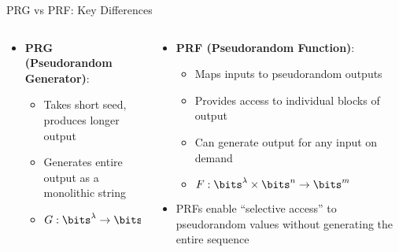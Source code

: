 \documentclass[aspectratio=169, lualatex, handout]{beamer}
\begin{document}
\begin{frame}{PRG vs PRF: Key Differences}
	\begin{columns}[t]
		\begin{column}{0.5\textwidth}
			\begin{itemize}[<+->]
				\item \textbf{PRG (Pseudorandom Generator)}:
				      \begin{itemize}[<+->]
					      \item Takes short seed, produces longer output
					      \item Generates entire output as a monolithic string
					      \item $G: \bits^\lambda \rightarrow \bits^{\lambda+\ell}$
				      \end{itemize}
			\end{itemize}
			\begin{center}
			\end{center}
		\end{column}
		\begin{column}{0.5\textwidth}
			\begin{itemize}[<+->]
				\item \textbf{PRF (Pseudorandom Function)}:
				      \begin{itemize}[<+->]
					      \item Maps inputs to pseudorandom outputs
					      \item Provides access to individual blocks of output
					      \item Can generate output for any input on demand
					      \item $F: \bits^\lambda \times \bits^n \rightarrow \bits^m$
				      \end{itemize}
				\item PRFs enable ``selective access'' to pseudorandom values without generating the entire sequence
			\end{itemize}
		\end{column}
	\end{columns}
\end{frame}
\end{document}
